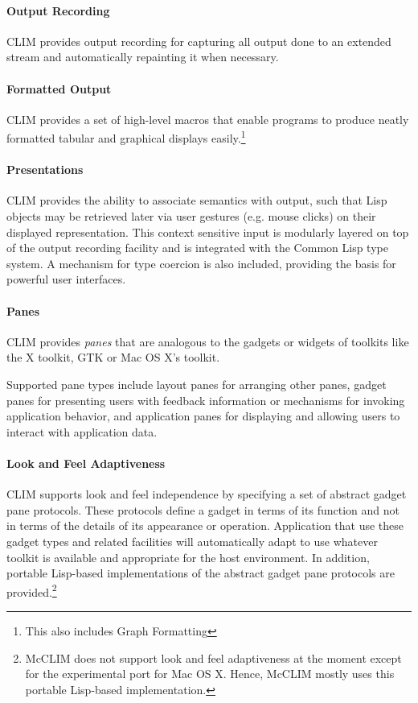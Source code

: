 \documentclass[twocolumn,a4paper]{article}
\newcommand {\concept} [1] {{\sl #1}\index{#1}}
\newcommand {\CLIM}{{\small CLIM}}
\begin{document}
\paragraph*{Output Recording} \CLIM{} provides output recording for
capturing all output done to an extended stream and automatically
repainting it when necessary.

\paragraph*{Formatted Output} \CLIM{} provides a set of high-level
macros that enable programs to produce neatly formatted tabular and
graphical displays easily.\footnote{This also includes Graph
  Formatting}

\paragraph*{Presentations} \CLIM{} provides the ability to associate
semantics with output, such that Lisp objects may be retrieved later
via user gestures (e.g. mouse clicks) on their displayed
representation. This context sensitive input is modularly layered on
top of the output recording facility and is integrated with the Common
Lisp type system. A mechanism for type coercion is also included,
providing the basis for powerful user interfaces.

\paragraph*{Panes} \CLIM{} provides \concept{panes} that are analogous
to the gadgets or widgets of toolkits like the X toolkit, GTK or Mac
OS X's toolkit.

Supported pane types include layout panes for arranging other panes,
gadget panes for presenting users with feedback information or
mechanisms for invoking application behavior, and application panes
for displaying and allowing users to interact with application data.

\paragraph*{Look and Feel Adaptiveness} \CLIM{} supports look and feel
independence by specifying a set of abstract gadget pane
protocols. These protocols define a gadget in terms of its function
and not in terms of the details of its appearance or
operation. Application that use these gadget types and related
facilities will automatically adapt to use whatever toolkit is
available and appropriate for the host environment. In addition,
portable Lisp-based implementations of the abstract gadget pane
protocols are provided.\footnote{McCLIM does not support look and feel
  adaptiveness at the moment except for the experimental port for Mac
  OS X. Hence, McCLIM mostly uses this portable Lisp-based
  implementation.}
\end{document}
